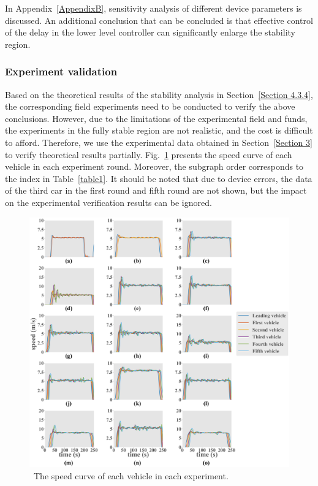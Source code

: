 \documentclass[a4paper]{cas-sc}
\begin{document}
In Appendix~\ref{AppendixB}, sensitivity analysis of different device parameters is discussed. An additional conclusion that can be concluded is that effective control of the delay in the lower level controller can significantly enlarge the stability region.



\subsubsection{Experiment validation}
\label{Section 4.3.5}

Based on the theoretical results of the stability analysis in Section~\ref{Section 4.3.4}, the corresponding field experiments need to be conducted to verify the above conclusions. However, due to the limitations of the experimental field and funds, the experiments in the fully stable region are not realistic, and the cost is difficult to afford. Therefore, we use the experimental data obtained in Section~\ref{Section 3} to verify theoretical results partially. Fig.~\ref{fig7} presents the speed curve of each vehicle in each experiment round. Moreover, the subgraph order corresponds to the index in Table~\ref{table1}. It should be noted that due to device errors, the data of the third car in the first round and fifth round are not shown, but the impact on the experimental verification results can be ignored.


\begin{figure}
  \centering
  \includegraphics[width=14cm]{figs/fig7.png}
  \caption{~The speed curve of each vehicle in each experiment.}
  \label{fig7}
\end{figure}
\end{document}
